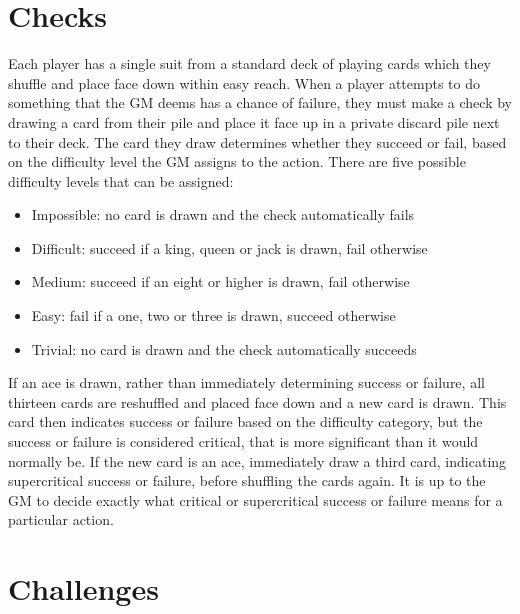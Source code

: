 \documentclass{report}
\begin{document}
\section{Checks}
Each player has a single suit from a standard deck of playing cards which they shuffle and place face down within easy
reach. When a player attempts to do something that the GM deems has a chance of failure, they must make a check by drawing
a card from their pile and place it face up in a private discard pile next to their deck. The card they draw determines
whether they succeed or fail, based on the difficulty level the GM assigns to the action. There are five possible
difficulty levels that can be assigned:
\begin{itemize}
  \item Impossible: no card is drawn and the check automatically fails
  \item Difficult: succeed if a king, queen or jack is drawn, fail otherwise
  \item Medium: succeed if an eight or higher is drawn, fail otherwise
  \item Easy: fail if a one, two or three is drawn, succeed otherwise
  \item Trivial: no card is drawn and the check automatically succeeds
\end{itemize}

If an ace is drawn, rather than immediately determining success or failure, all thirteen cards are reshuffled and placed
face down and a new card is drawn. This card then indicates success or failure based on the difficulty category, but the
success or failure is considered critical, that is more significant than it would normally be. If the new card is an ace,
immediately draw a third card, indicating supercritical success or failure, before shuffling the cards again. It is up to
the GM to decide exactly what critical or supercritical success or failure means for a particular action.

\section{Challenges}
\end{document}

